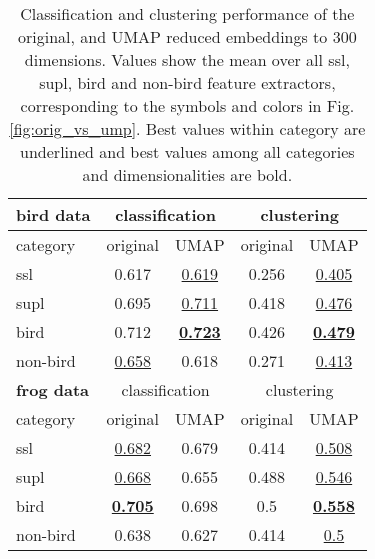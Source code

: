
\begin{table}[t]
  
  \caption{Classification and clustering performance of the original, and UMAP reduced embeddings to 300 dimensions. Values show the mean over all ssl, supl, bird and non-bird feature extractors, corresponding to the symbols and colors in Fig. \ref{fig:orig_vs_ump}. Best values within category are underlined and best values among all categories and dimensionalities are bold.}
  \label{tab:results}
  \centering
  \begin{tabular}{|l|cc|cc|}
    \hline
    \textbf{bird data}& \multicolumn{2}{c|}{classification} & \multicolumn{2}{c|}{clustering}\\
    \hline
    category &
    original &
    UMAP &
    original &
    UMAP \\
    \hline
    ssl & 0.617 & \underline{0.619} & 0.256 & \underline{0.405}\\
    supl & 0.695 & \underline{0.711} & 0.418 & \underline{0.476}\\
    bird & 0.712 & \underline{\textbf{0.723}} & 0.426 & \underline{\textbf{0.479}}\\
    non-bird & \underline{0.658} & 0.618 & 0.271 & \underline{0.413}\\
    \hline
    \hline
    \textbf{frog data}& \multicolumn{2}{c|}{classification} & \multicolumn{2}{c|}{clustering}\\
    \hline
    category &
    original &
    UMAP &
    original &
    UMAP \\
    \hline
    ssl & \underline{0.682} & 0.679 & 0.414 & \underline{0.508}\\
    supl & \underline{0.668} & 0.655 & 0.488 & \underline{0.546}\\
    bird & \underline{\textbf{0.705}} & 0.698 & 0.5 & \underline{\textbf{0.558}}\\
    non-bird & 0.638 & 0.627 & 0.414 & \underline{0.5}\\
    \hline
    
    
    
    
    \hline
  \end{tabular}
\end{table}


    
